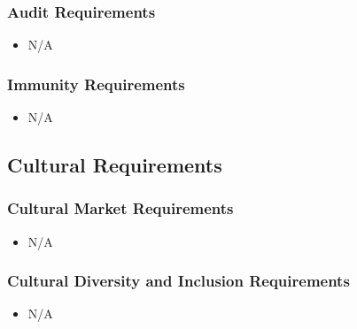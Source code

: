 \documentclass[12pt]{article}
\newcounter{nfrnum} %
\begin{document}
  \subsubsection{Audit Requirements}
    \noindent \begin{itemize}
		\item N/A
    \end{itemize}
  \subsubsection{Immunity Requirements}
    \noindent \begin{itemize}
      \item N/A
    \end{itemize}



\subsection{Cultural Requirements}
  \subsubsection{Cultural Market Requirements}
    \noindent \begin{itemize}
		
		\item N/A
    \end{itemize}
  \subsubsection{Cultural Diversity and Inclusion Requirements}
    \noindent \begin{itemize}
		\item N/A
    \end{itemize}
\end{document}
